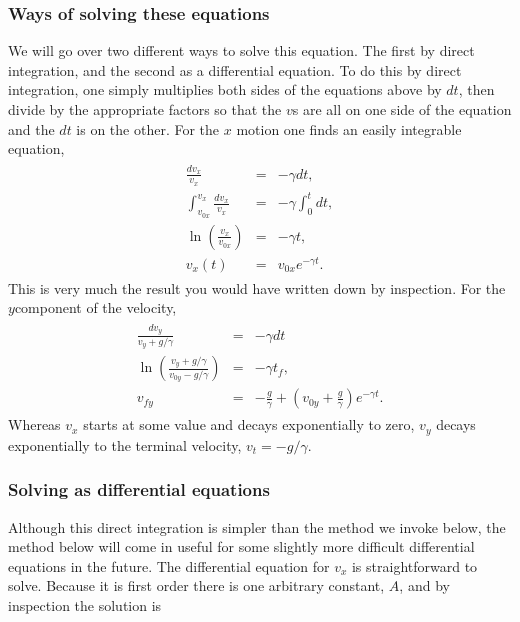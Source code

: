 \documentclass[letterpaper,10pt,english]{sphinxmanual}
\begin{document}
\subsubsection{Ways of solving these equations}
\label{\detokenize{chapter3:ways-of-solving-these-equations}}
We will go over two different ways to solve this equation. The first
by direct integration, and the second as a differential equation. To
do this by direct integration, one simply multiplies both sides of the
equations above by \(dt\), then divide by the appropriate factors so
that the \(v\)s are all on one side of the equation and the \(dt\) is on
the other. For the \(x\) motion one finds an easily integrable equation,
\begin{equation*}
\begin{split}
\begin{eqnarray}
\frac{dv_x}{v_x}&=&-\gamma dt,\\
\nonumber
\int_{v_{0x}}^{v_{x}}\frac{dv_x}{v_x}&=&-\gamma\int_0^{t}dt,\\
\nonumber
\ln\left(\frac{v_{x}}{v_{0x}}\right)&=&-\gamma t,\\
\nonumber
v_{x}(t)&=&v_{0x}e^{-\gamma t}.
\end{eqnarray}
\end{split}
\end{equation*}
This is very much the result you would have written down
by inspection. For the \(y\)\sphinxhyphen{}component of the velocity,
\begin{equation*}
\begin{split}
\begin{eqnarray}
\frac{dv_y}{v_y+g/\gamma}&=&-\gamma dt\\
\nonumber
\ln\left(\frac{v_{y}+g/\gamma}{v_{0y}-g/\gamma}\right)&=&-\gamma t_f,\\
\nonumber
v_{fy}&=&-\frac{g}{\gamma}+\left(v_{0y}+\frac{g}{\gamma}\right)e^{-\gamma t}.
\end{eqnarray}
\end{split}
\end{equation*}
Whereas \(v_x\) starts at some value and decays
exponentially to zero, \(v_y\) decays exponentially to the terminal
velocity, \(v_t=-g/\gamma\).


\subsubsection{Solving as differential equations}
\label{\detokenize{chapter3:solving-as-differential-equations}}
Although this direct integration is simpler than the method we invoke
below, the method below will come in useful for some slightly more
difficult differential equations in the future. The differential
equation for \(v_x\) is straight\sphinxhyphen{}forward to solve. Because it is first
order there is one arbitrary constant, \(A\), and by inspection the
solution is
\end{document}
